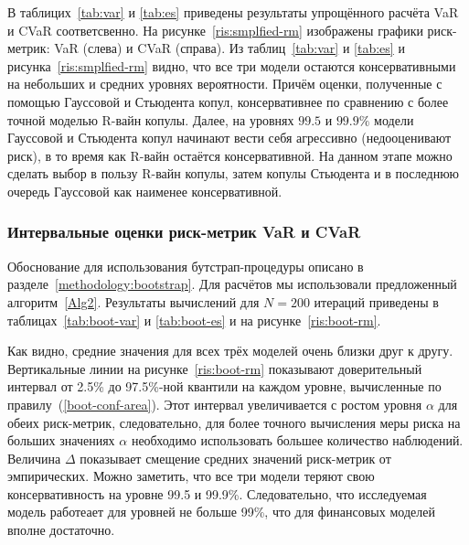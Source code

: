 
В таблицих~\ref{tab:var} и \ref{tab:es} приведены результаты упрощённого расчёта VaR и CVaR соответсвенно.
На рисунке~\ref{ris:smplfied-rm} изображены графики риск-метрик: VaR (слева) и CVaR (справа). 
Из таблиц~\ref{tab:var} и \ref{tab:es} и рисунка~\ref{ris:smplfied-rm} видно, что все три модели остаются консервативными на небольших и средних уровнях вероятности. 
Причём оценки, полученные с помощью Гауссовой и Стьюдента копул, консервативнее по сравнению с более точной моделью R-вайн копулы.
Далее, на уровнях $99.5$ и $99.9\%$ модели Гауссовой и Стьюдента копул начинают вести себя агрессивно (недооценивают риск), в то время как R-вайн остаётся консервативной.
На данном этапе можно сделать выбор в пользу R-вайн копулы, затем копулы Стьюдента и в последнюю очередь Гауссовой как наименее консервативной.

\subsubsection{Интервальные оценки риск-метрик VaR и CVaR}

Обоснование для использования бутстрап-процедуры описано в разделе~\ref{methodology:bootstrap}.
Для расчётов мы использовали предложенный алгоритм~\ref{Alg2}.
Результаты вычислений для $N=200$ итераций приведены в таблицах~\ref{tab:boot-var} и \ref{tab:boot-es} и на рисунке~\ref{ris:boot-rm}.

Как видно, средние значения для всех трёх моделей очень близки друг к другу.
Вертикальные линии на рисунке~\ref{ris:boot-rm} показывают доверительный интервал от 2.5\% до 97.5\%-ной квантили на каждом уровне, вычисленные по правилу~(\ref{boot-conf-area}).
Этот интервал увеличивается с ростом уровня $\alpha$ для обеих риск-метрик, следовательно, для более точного вычисления меры риска на больших значениях $\alpha$ необходимо использовать большее количество наблюдений.
Величина $\Delta$ показывает смещение средних значений риск-метрик от эмпирических. 
Можно заметить, что все три модели теряют свою консервативность на уровне 99.5 и 99.9\%.
Следовательно, что исследуемая модель работеает для уровней не больше 99\%, что для финансовых моделей вполне достаточно.

